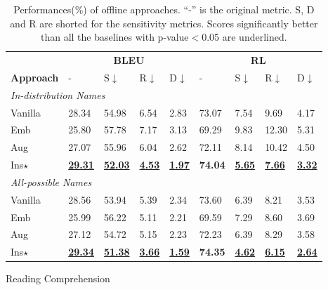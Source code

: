 \begin{table}[t]
	\begin{subtable}{\linewidth}
		\scriptsize
		\centering
		\begin{tabular}{p{0.9cm}|p{0.36cm}p{0.36cm}p{0.36cm}p{0.36cm}|p{0.36cm}p{0.36cm}p{0.36cm}p{0.38cm}}
			\toprule[1pt]
			& \multicolumn{4}{c|}{\textbf{BLEU}} & \multicolumn{4}{c}{\textbf{RL}} \\
			\textbf{Approach}& - & S$\downarrow$ & R$\downarrow$& D$\downarrow$  & - & S$\downarrow$  & R$\downarrow$& D$\downarrow$ \\
			\hline
			\multicolumn{9}{l}{\textit{In-distribution Names}}\\
			Vanilla &28.34 & 54.98 & 6.54 & 2.83 &73.07&7.54& 9.69 & 4.17 \\
			Emb & 25.80 &57.78& 7.17 & 3.13 & 69.29 &9.83& 12.30 & 5.31 \\
			Aug & 27.07 & 55.96& 6.04 & 2.62 & 72.11&8.14 & 10.42&  4.50 \\
			

			Ins$\star$ & \underline{\textbf{29.31}} &\underline{\textbf{52.03}}& \underline{\textbf{4.53}} & \underline{\textbf{1.97}} & \textbf{74.04} &\underline{\textbf{5.65}} & \underline{\textbf{7.66}} & \underline{\textbf{3.32}}\\
			
			\hline
			\multicolumn{9}{l}{\textit{All-possible Names}}\\
			Vanilla &  28.56 & 53.94& 5.39 & 2.34& 73.60&6.39 & 8.21  & 3.53\\
			Emb &25.99 &  56.22 & 5.11 & 2.21&69.59&7.29 & 8.60 & 3.69\\
			Aug & 27.12 & 54.72 & 5.15 & 2.23& 72.23& 6.39 & 8.29  & 3.58\\
			
			Ins$\star$ &  \underline{\textbf{29.34}} &\underline{\textbf{51.38}}  & \underline{\textbf{3.66}} & \underline{\textbf{1.59}}& \textbf{74.35}&\underline{\textbf{4.62}} & \underline{\textbf{6.15}} & \underline{\textbf{2.64}}\\
			
			\bottomrule[1pt]
		\end{tabular}
		\caption{Reading Comprehension}
		\label{tab:mdresults-rc}
	\end{subtable}
	\caption{Performances(\%) of offline approaches. ``-'' is the original metric. S, D and R are shorted for the sensitivity metrics. Scores significantly better than all the baselines with p-value$<$0.05 are underlined.}	
	\label{tab:mdresults-main}
\end{table}

